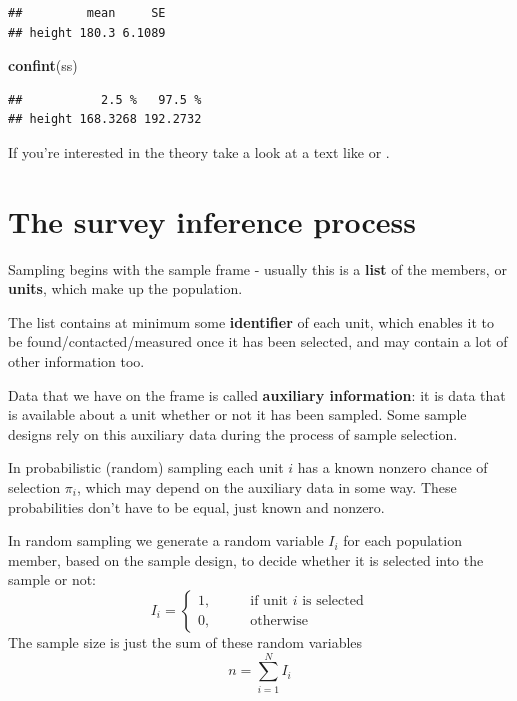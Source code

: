 \documentclass[
]{book}
\newenvironment{Shaded}{\begin{snugshade}}{\end{snugshade}}
\newcommand{\FunctionTok}[1]{\textcolor[rgb]{0.13,0.29,0.53}{\textbf{#1}}}
\newcommand{\NormalTok}[1]{#1}
\begin{document}
\begin{verbatim}
##         mean     SE
## height 180.3 6.1089
\end{verbatim}

\begin{Shaded}
\begin{Highlighting}[]
\FunctionTok{confint}\NormalTok{(ss)}
\end{Highlighting}
\end{Shaded}

\begin{verbatim}
##           2.5 %   97.5 %
## height 168.3268 192.2732
\end{verbatim}

If you're interested in the theory take a look at a text like \citet{cochran} or \citet{ssw}.

\section{The survey inference process}\label{the-survey-inference-process}

Sampling begins with the sample frame - usually this is a \textbf{list} of the
members, or \textbf{units}, which make up the population.

The list contains at minimum some \textbf{identifier} of each unit, which enables
it to be found/contacted/measured once it has been selected, and may contain
a lot of other information too.

Data that we have on the frame is called \textbf{auxiliary information}: it is
data that is available about a unit whether or not it has been sampled. Some
sample designs rely on this auxiliary data during the process of sample selection.

In probabilistic (random) sampling each unit \(i\) has a known nonzero chance of
selection \(\pi_i\), which may depend on the auxiliary data in some way.
These probabilities don't have to be equal, just known and nonzero.

In random sampling we generate a random variable \(I_i\) for each
population member, based on the sample design, to decide whether it is
selected into the sample or not:
\begin{equation}
   I_i = \begin{cases}
         1,\qquad &\text{if unit $i$ is selected}\\
         0,       &\text{otherwise}
         \end{cases}
\end{equation}
The sample size is just the sum of these random variables
\[
   n = \sum_{i=1}^N I_i
\]
\end{document}
